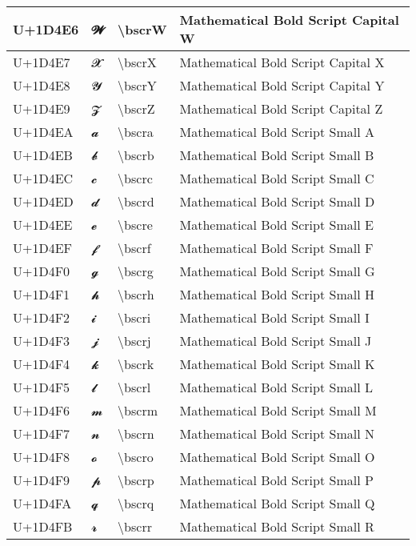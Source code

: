 \begin{table}[h]
\begin{tabulary}{\linewidth}{|L|L|L|L|}
\hline
U+1D4E6 & 𝓦 & {\textbackslash}bscrW & Mathematical Bold Script Capital W \\
\hline
U+1D4E7 & 𝓧 & {\textbackslash}bscrX & Mathematical Bold Script Capital X \\
\hline
U+1D4E8 & 𝓨 & {\textbackslash}bscrY & Mathematical Bold Script Capital Y \\
\hline
U+1D4E9 & 𝓩 & {\textbackslash}bscrZ & Mathematical Bold Script Capital Z \\
\hline
U+1D4EA & 𝓪 & {\textbackslash}bscra & Mathematical Bold Script Small A \\
\hline
U+1D4EB & 𝓫 & {\textbackslash}bscrb & Mathematical Bold Script Small B \\
\hline
U+1D4EC & 𝓬 & {\textbackslash}bscrc & Mathematical Bold Script Small C \\
\hline
U+1D4ED & 𝓭 & {\textbackslash}bscrd & Mathematical Bold Script Small D \\
\hline
U+1D4EE & 𝓮 & {\textbackslash}bscre & Mathematical Bold Script Small E \\
\hline
U+1D4EF & 𝓯 & {\textbackslash}bscrf & Mathematical Bold Script Small F \\
\hline
U+1D4F0 & 𝓰 & {\textbackslash}bscrg & Mathematical Bold Script Small G \\
\hline
U+1D4F1 & 𝓱 & {\textbackslash}bscrh & Mathematical Bold Script Small H \\
\hline
U+1D4F2 & 𝓲 & {\textbackslash}bscri & Mathematical Bold Script Small I \\
\hline
U+1D4F3 & 𝓳 & {\textbackslash}bscrj & Mathematical Bold Script Small J \\
\hline
U+1D4F4 & 𝓴 & {\textbackslash}bscrk & Mathematical Bold Script Small K \\
\hline
U+1D4F5 & 𝓵 & {\textbackslash}bscrl & Mathematical Bold Script Small L \\
\hline
U+1D4F6 & 𝓶 & {\textbackslash}bscrm & Mathematical Bold Script Small M \\
\hline
U+1D4F7 & 𝓷 & {\textbackslash}bscrn & Mathematical Bold Script Small N \\
\hline
U+1D4F8 & 𝓸 & {\textbackslash}bscro & Mathematical Bold Script Small O \\
\hline
U+1D4F9 & 𝓹 & {\textbackslash}bscrp & Mathematical Bold Script Small P \\
\hline
U+1D4FA & 𝓺 & {\textbackslash}bscrq & Mathematical Bold Script Small Q \\
\hline
U+1D4FB & 𝓻 & {\textbackslash}bscrr & Mathematical Bold Script Small R \\

\end{tabulary}
\end{table}
